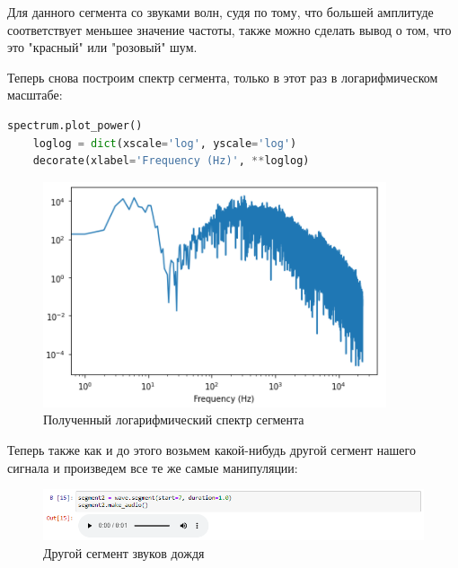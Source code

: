 \documentclass[a4paper]{article}
\begin{document}
            Для данного сегмента со звуками волн, судя по тому, что большей амплитуде соответствует меньшее значение частоты, также можно сделать вывод о том, что это "красный" или "розовый" шум.
            
            Теперь снова построим спектр сегмента, только в этот раз в логарифмическом масштабе:
            
\begin{lstlisting}[language=Python, caption= Получение логарифмического спектра сегмента]
    spectrum.plot_power()
    loglog = dict(xscale='log', yscale='log')
    decorate(xlabel='Frequency (Hz)', **loglog)
\end{lstlisting}               
            
            \begin{figure}[H]
                \centering
                \includegraphics{ex_1_wave_log_spectr.png}
                \caption{Полученный логарифмический спектр сегмента}
                \label{fig:ex_1_wave_log_spectr}
            \end{figure}
            
            Теперь также как и до этого возьмем какой-нибудь другой сегмент нашего сигнала и произведем все те же самые манипуляции:
            
             \begin{figure}[H]
                \centering
                \includegraphics[width=\textwidth]{ex_1_wave_second_segment.png}
                \caption{Другой сегмент звуков дождя}
                \label{fig:ex_1_wave_second_segment}
            \end{figure}
            
\end{document}
